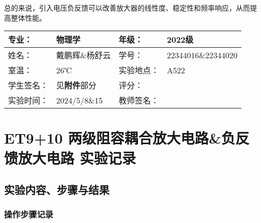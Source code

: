 \documentclass[dvipsnames, svgnames,a4paper,11pt]{article}
\begin{document}
		总的来说，引入电压负反馈可以改善放大器的线性度、稳定性和频率响应，从而提高整体性能。



	
	
	
	\clearpage
	
	\begin{table}
		\renewcommand\arraystretch{1.7}
		\centering
		\begin{tabularx}{\textwidth}{|X|X|X|X|}
			\hline
			专业： & 物理学 & 年级： & 2022级 \\
			\hline
			姓名： & 戴鹏辉\&杨舒云 & 学号： & 22344016\&22344020\\
			\hline
			室温： & 26℃  & 实验地点： & A522 \\
			\hline
			学生签名：& 见\textbf{附件}部分 & 评分： &\\
			\hline
			实验时间：& 2024/5/8\&15 & 教师签名：&\\
			\hline
		\end{tabularx}
	\end{table}
	
	\section{ET9+10 \quad 两级阻容耦合放大电路\&负反馈放大电路  \quad\heiti 实验记录}
	
	\subsection{实验内容、步骤与结果}
	
	\subsubsection{操作步骤记录}
		
\end{document}
